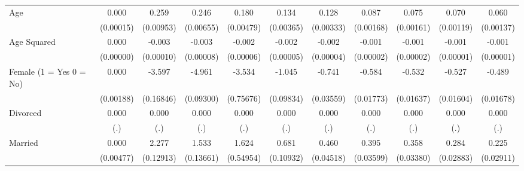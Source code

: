 {\begin{tabular}{l*{10}{c}}
Age                 &       0.000         &       0.259\sym{***}&       0.246\sym{***}&       0.180\sym{***}&       0.134\sym{***}&       0.128\sym{***}&       0.087\sym{***}&       0.075\sym{***}&       0.070\sym{***}&       0.060\sym{***}\\
                    &   (0.00015)         &   (0.00953)         &   (0.00655)         &   (0.00479)         &   (0.00365)         &   (0.00333)         &   (0.00168)         &   (0.00161)         &   (0.00119)         &   (0.00137)         \\
Age Squared         &       0.000         &      -0.003\sym{***}&      -0.003\sym{***}&      -0.002\sym{***}&      -0.002\sym{***}&      -0.002\sym{***}&      -0.001\sym{***}&      -0.001\sym{***}&      -0.001\sym{***}&      -0.001\sym{***}\\
                    &   (0.00000)         &   (0.00010)         &   (0.00008)         &   (0.00006)         &   (0.00005)         &   (0.00004)         &   (0.00002)         &   (0.00002)         &   (0.00001)         &   (0.00001)         \\
Female (1 = Yes 0 = No)&       0.000         &      -3.597\sym{***}&      -4.961\sym{***}&      -3.534\sym{***}&      -1.045\sym{***}&      -0.741\sym{***}&      -0.584\sym{***}&      -0.532\sym{***}&      -0.527\sym{***}&      -0.489\sym{***}\\
                    &   (0.00188)         &   (0.16846)         &   (0.09300)         &   (0.75676)         &   (0.09834)         &   (0.03559)         &   (0.01773)         &   (0.01637)         &   (0.01604)         &   (0.01678)         \\
Divorced            &       0.000         &       0.000         &       0.000         &       0.000         &       0.000         &       0.000         &       0.000         &       0.000         &       0.000         &       0.000         \\
                    &         (.)         &         (.)         &         (.)         &         (.)         &         (.)         &         (.)         &         (.)         &         (.)         &         (.)         &         (.)         \\
Married             &       0.000         &       2.277\sym{***}&       1.533\sym{***}&       1.624\sym{**} &       0.681\sym{***}&       0.460\sym{***}&       0.395\sym{***}&       0.358\sym{***}&       0.284\sym{***}&       0.225\sym{***}\\
                    &   (0.00477)         &   (0.12913)         &   (0.13661)         &   (0.54954)         &   (0.10932)         &   (0.04518)         &   (0.03599)         &   (0.03380)         &   (0.02883)         &   (0.02911)         \\

\end{tabular}}

